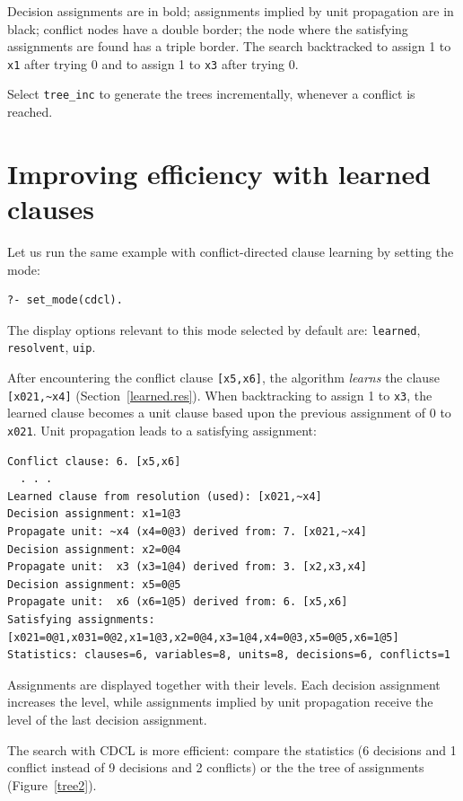 \documentclass[11pt]{report}
\newcommand*{\p}[1]{\textup{\texttt{#1}}}
\begin{document}
Decision assignments are in bold; assignments implied by unit
propagation are in black; conflict nodes have a double border; the node
where the satisfying assignments are found has a triple border. The
search backtracked to assign 1 to \p{x1} after trying 0 and to assign 1
to \p{x3} after trying 0.

Select \p{tree\_inc} to generate the trees incrementally, whenever a
conflict is reached.

\section{Improving efficiency with learned clauses}

Let us run the same example with conflict-directed clause learning by
setting the mode:

\begin{verbatim}
?- set_mode(cdcl).
\end{verbatim}

The display options relevant to this mode selected by default are:
\p{learned}, \p{resolvent}, \p{uip}.

After encountering the conflict clause \verb+[x5,x6]+, the algorithm
\emph{learns} the clause \verb+[x021,~x4]+ (Section~\ref{learned.res}).
When backtracking to assign 1 to \p{x3}, the learned clause becomes a
unit clause based upon the previous assignment of 0 to \p{x021}. Unit
propagation leads to a satisfying assignment:

\begin{verbatim}
Conflict clause: 6. [x5,x6]
  . . .
Learned clause from resolution (used): [x021,~x4]
Decision assignment: x1=1@3
Propagate unit: ~x4 (x4=0@3) derived from: 7. [x021,~x4]
Decision assignment: x2=0@4
Propagate unit:  x3 (x3=1@4) derived from: 3. [x2,x3,x4]
Decision assignment: x5=0@5
Propagate unit:  x6 (x6=1@5) derived from: 6. [x5,x6]
Satisfying assignments:
[x021=0@1,x031=0@2,x1=1@3,x2=0@4,x3=1@4,x4=0@3,x5=0@5,x6=1@5]
Statistics: clauses=6, variables=8, units=8, decisions=6, conflicts=1
\end{verbatim}
Assignments are displayed together with their levels. Each decision
assignment increases the level, while assignments implied by unit
propagation receive the level of the last decision assignment. 

The search with CDCL is more efficient: compare the statistics (6
decisions and 1 conflict instead of 9 decisions and 2 conflicts) or the
the tree of assignments (Figure~\ref{tree2}).
\end{document}
